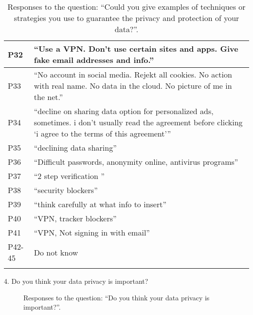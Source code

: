 \begin{longtable}{p{3cm} p{13cm}}
    \hline
    P32 & ``Use a VPN. Don't use certain sites and apps. Give fake email addresses and info.'' \\
    \hline
    P33 & ``No account in social media. Rejekt all cookies. No action with real name. No data in the cloud. No picture of me in the net.'' \\
    \hline
    P34 & ``decline on sharing data option for personalized ads, sometimes. i don't usually read the agreement before clicking `i agree to the terms of this agreement''' \\
    \hline
    P35 & ``declining data sharing'' \\
    \hline
    P36 & ``Difficult passwords, anonymity online, antivirus programs'' \\
    \hline
    P37 & ``2 step verification '' \\
    \hline
    P38 & ``security blockers'' \\
    \hline
    P39 & ``think carefully at what info to insert'' \\
    \hline
    P40 & ``VPN, tracker blockers'' \\
    \hline
    P41 & ``VPN, Not signing in with email'' \\
    \hline
    P42-45 & Do not know \\
    \hline
    \caption{Responses to the question: ``Could you give examples of techniques or strategies you use to guarantee the privacy and protection of your data?''.}
    \label{table:survey_s1_q3}
\end{longtable}

4. Do you think your data privacy is important?

\begin{figure}[H]
    \begin{center}
        \caption{Responses to the question: ``Do you think your data privacy is important?''.}
        \label{fig:survey_s1_q4}
    \end{center}
\end{figure}

